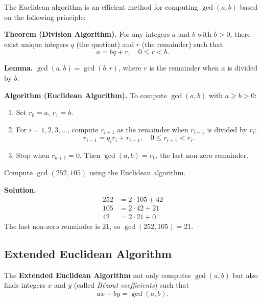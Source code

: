 \documentclass[11pt,a4paper]{article}
\begin{document}
The Euclidean algorithm is an efficient method for computing $\gcd(a, b)$ based on the following principle:

\textbf{Theorem (Division Algorithm).} For any integers $a$ and $b$ with $b > 0$, there exist unique integers $q$ (the quotient) and $r$ (the remainder) such that
\begin{equation*}
    a = bq + r, \quad 0 \leq r < b.
\end{equation*}

\textbf{Lemma.} $\gcd(a, b) = \gcd(b, r)$, where $r$ is the remainder when $a$ is divided by $b$.

\textbf{Algorithm (Euclidean Algorithm).} To compute $\gcd(a, b)$ with $a \geq b > 0$:
\begin{enumerate}[label=\textbf{Step \arabic*:}]
    \item Set $r_0 = a$, $r_1 = b$.
    \item For $i = 1, 2, 3, \dots$, compute $r_{i+1}$ as the remainder when $r_{i-1}$ is divided by $r_i$:
    \begin{equation*}
        r_{i-1} = q_i r_i + r_{i+1}, \quad 0 \leq r_{i+1} < r_i.
    \end{equation*}
    \item Stop when $r_{k+1} = 0$. Then $\gcd(a, b) = r_k$, the last non-zero remainder.
\end{enumerate}

\begin{example}
Compute $\gcd(252, 105)$ using the Euclidean algorithm.

\textbf{Solution.}
\begin{align*}
    252 &= 2 \cdot 105 + 42 \\
    105 &= 2 \cdot 42 + 21 \\
    42 &= 2 \cdot 21 + 0.
\end{align*}
The last non-zero remainder is $21$, so $\gcd(252, 105) = 21$.
\end{example}

\subsection{Extended Euclidean Algorithm}

The \textbf{Extended Euclidean Algorithm} not only computes $\gcd(a, b)$ but also finds integers $x$ and $y$ (called \textit{Bézout coefficients}) such that
\begin{equation*}
    ax + by = \gcd(a, b).
\end{equation*}
\end{document}
